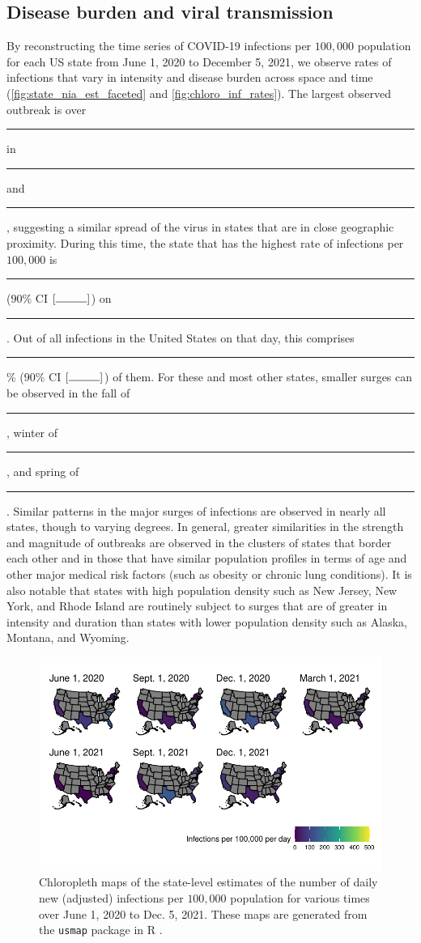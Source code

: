 \documentclass{article}
\begin{document}
\subsection{Disease burden and viral transmission}
By reconstructing the time series of COVID-19 infections per $100,000$
population for each US state from June 1, 2020 to December 5, 2021, we observe
rates of infections that vary in intensity and disease burden across space and
time (\autoref{fig:state_nia_est_faceted} and \autoref{fig:chloro_inf_rates}).
The largest observed outbreak is over \rule{1cm}{0.15mm} in \rule{1cm}{0.15mm}
and \rule{1cm}{0.15mm}, suggesting a similar spread of the virus in states that
are in close geographic proximity. During this time, the state that has the
highest rate of infections per $100,000$ is \rule{1cm}{0.15mm} ($90\%$ CI
$[\rule{1cm}{0.15mm}]$) on \rule{1cm}{0.15mm}. Out of all infections in the
United States on that day, this comprises \rule{1cm}{0.15mm}\% ($90\%$ CI
$[\rule{1cm}{0.15mm}]$) of them. For these and most other states, smaller surges
can be observed in the fall of \rule{1cm}{0.15mm}, winter of \rule{1cm}{0.15mm},
and spring of \rule{1cm}{0.15mm}. Similar patterns in the major surges of
infections are observed in nearly all states, though to varying degrees. In
general, greater similarities in the strength and magnitude of outbreaks are
observed in the clusters of states that border each other and in those that have
similar population profiles in terms of age and other major medical risk factors
(such as obesity or chronic lung conditions). It is also notable that states
with high population density such as New Jersey, New York, and Rhode Island are
routinely subject to surges that are of greater in intensity and duration than
states with lower population density such as Alaska, Montana, and Wyoming.

\begin{figure}[!tb]
\centering
    \includegraphics[width=.99\textwidth]{chloro_inf_rates.pdf}
    \caption{Chloropleth maps of the state-level estimates of the number of 
    daily new (adjusted) infections per $100,000$ population for various times 
    over June 1, 2020 to Dec. 5, 2021. These maps are generated from the \texttt{usmap} 
    package in R \citep{lorenzo2023usmap}.} 
    \label{fig:chloro_inf_rates}
\end{figure}
\end{document}
